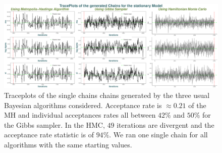 \begin{figure}[!htb]
	\centering	\includegraphics[width=1\linewidth]{traceall.pdf}	\caption{ Traceplots of the single chains chains generated by the three usual Bayesian algorithms considered. Acceptance rate is $\approx0.21$ of the MH and individual acceptances rates all between $42\%$ and $50\%$ for the Gibbs sampler. In the HMC, $49$ iterations are divergent and the acceptance rate statistic is of  $94\%$.
	We ran one single chain for all algorithms with the same starting values.}\label{fig:mhgibhmc}
\end{figure}


